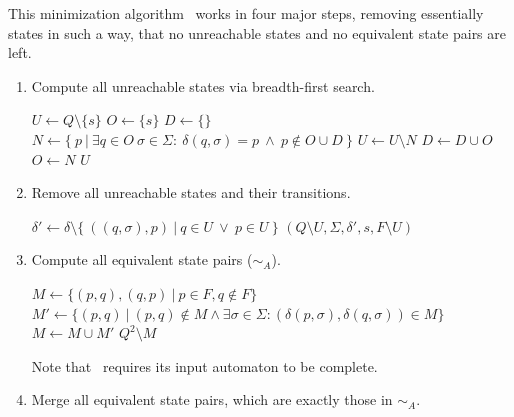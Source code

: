 This minimization algorithm \MinAlg\ works in four major steps, removing essentially states in such a way, that no unreachable states and no equivalent state pairs are left.
\begin{enumerate}
	\item Compute all unreachable states via breadth-first search.
	
	\vspace{0.2cm}
	\begin{algorithmic}[1]
			\State $U \gets Q \setminus \{s\}$	
			\State $O \gets \{s\}$				
			\State $D \gets \{\}$				
				\State $N \gets \{\ p\ | \ \exists q \in O\ \sigma \in \Sigma \colon\ \delta(q, \sigma) = p\ \land\ p \notin O \cup D\ \}$
				\State $U \gets U \setminus N$
				\State $D \gets D \cup O$
				\State $O \gets N$
			\EndWhile
			\State \Return $U$
		\EndFunction
	\end{algorithmic}

	\item Remove all unreachable states and their transitions.
	
	\vspace{0.2cm}
	\begin{algorithmic}[1]
            \State $\delta' \gets \delta \setminus \{\ ((q,\sigma),p)\ |\ q\in U\ \lor\ p\in U\ \}$
			\State \Return $(Q \setminus U, \Sigma, \delta', s, F \setminus U)$
		\EndFunction
	\end{algorithmic}

	\item Compute all equivalent state pairs ($\sim_A$).
	
	\vspace{0.2cm}
	\begin{algorithmic}[1]
		 \label{ch:1:minmark}
		\State $M \gets \{ (p,q), (q,p)\ |\ p \in F, q \notin F \}$
		\Do
			\State $M' \gets \{ (p,q)\ |\ (p,q) \notin M \land \exists \sigma \in \Sigma \colon (\delta(p,\sigma), \delta(q,\sigma)) \in M \}$
			\State $M \gets M \cup M'$
		\State \Return $Q^2 \setminus M$
		\EndFunction
	\end{algorithmic}
	Note that \CompDist\ requires its input automaton to be complete. 

	\item Merge all equivalent state pairs, which are exactly those in $\sim_A$.
	

\end{enumerate}
